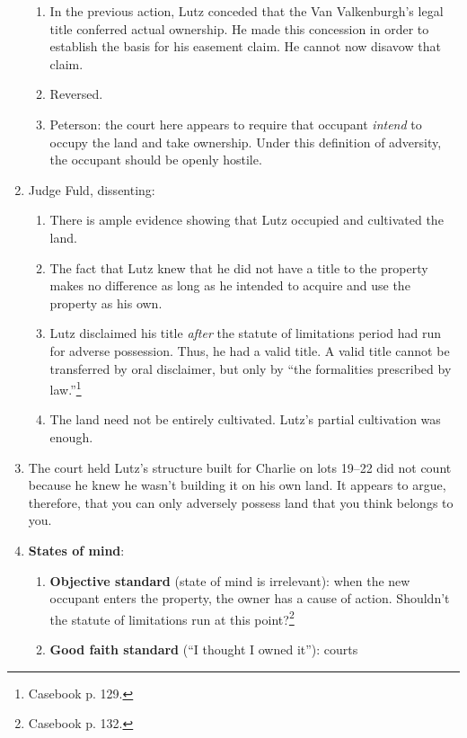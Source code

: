 \begin{enumerate}
\begin{enumerate}
        \item In the previous action, Lutz conceded that the Van 
        Valkenburgh's legal title conferred actual ownership. He made this 
        concession in order to establish the basis for his easement claim. 
        He cannot now disavow that claim.
        \item Reversed.
        \item Peterson: the court here appears to require that occupant 
        \emph{intend} to occupy the land and take ownership. Under this 
        definition of adversity, the occupant should be openly hostile.
    \end{enumerate}
    \item Judge Fuld, dissenting:
    \begin{enumerate}
        \item There is ample evidence showing that Lutz occupied and 
        cultivated the land.
        \item The fact that Lutz knew that he did not have a title to the 
        property makes no difference as long as he intended to acquire and use 
        the property as his own.
        \item Lutz disclaimed his title \emph{after} the statute of 
        limitations period had run for adverse possession. Thus, he had a 
        valid title. A valid title cannot be transferred by oral disclaimer, 
        but only by ``the formalities prescribed by law.''\footnote{Casebook 
        p. 129.}
        \item The land need not be entirely cultivated. Lutz's partial 
        cultivation was enough.
    \end{enumerate}
    \item The court held Lutz's structure built for Charlie on 
    lots 19--22 did not count because he knew he wasn't building it on his own 
    land. It appears to argue, therefore, that you can only adversely possess land 
    that you think belongs to you.
    \item \textbf{States of mind}:
    \begin{enumerate}
        \item \textbf{Objective standard} (state of mind is irrelevant): when 
        the new occupant enters the property, the owner has a cause of action. 
        Shouldn't the statute of limitations run at this 
        point?\footnote{Casebook p. 132.}
        \item \textbf{Good faith standard} (``I thought I owned it''): courts 

\end{enumerate}
\end{enumerate}
